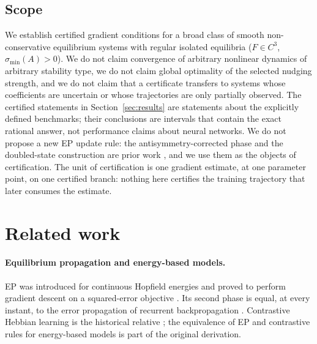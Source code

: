 \documentclass[11pt]{article}
\theoremstyle{definition}
\theoremstyle{remark}
\begin{document}
\subsection{Scope}

We establish certified gradient conditions for a broad class of smooth non-conservative
equilibrium systems with regular isolated equilibria ($F \in C^3$, $\sigma_{\min}(A) > 0$). We do
not claim convergence of arbitrary nonlinear dynamics of arbitrary stability type, we do not
claim global optimality of the selected nudging strength, and we do not claim that a certificate
transfers to systems whose coefficients are uncertain or whose trajectories are only partially
observed. The certified statements in Section~\ref{sec:results} are statements about the
explicitly defined benchmarks; their conclusions are intervals that contain the exact rational
answer, not performance claims about neural networks. We do not propose a new EP update rule: the
antisymmetry-corrected phase and the doubled-state construction are prior work
\cite{scurria2026,hoier2023}, and we use them as the objects of certification. The unit of
certification is one gradient estimate, at one parameter point, on one certified branch: nothing
here certifies the training trajectory that later consumes the estimate.

\section{Related work}

\paragraph{Equilibrium propagation and energy-based models.}
EP was introduced for continuous Hopfield energies and proved to perform gradient descent on a
squared-error objective \cite{scellier2017,hopfield1984}. Its second phase is equal, at every
instant, to the error propagation of recurrent backpropagation \cite{ernoult2019,pineda1987}.
Contrastive Hebbian learning is the historical relative \cite{movellan1991}; the equivalence of
EP and contrastive rules for energy-based models is part of the original derivation.
\end{document}
